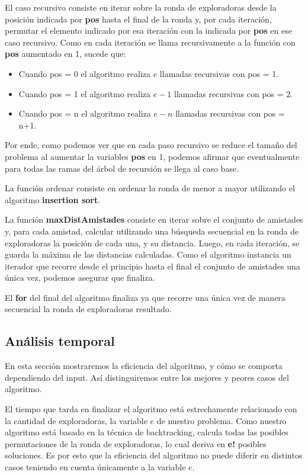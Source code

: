 \documentclass[spanish,a4paper]{article}
\begin{document}
El caso recursivo consiste en iterar sobre la ronda de exploradoras desde la posición indicada por \textbf{pos} 
hasta el final de la ronda y, por cada iteración, permutar el elemento indicado por esa iteración con la indicada por 
\textbf{pos} en ese caso recursivo. 
Como en cada iteración se llama recursivamente a la función con \textbf{pos} aumentado en 1, sucede que:

\begin{itemize}
\item Cuando pos = 0 el algoritmo realiza $e$ llamadas recursivas con pos = 1.
\item Cuando pos = 1 el algoritmo realiza $e-1$ llamadas recursivas con pos = 2.
\item Cuando pos = n el algoritmo realiza $e-n$ llamadas recursivas con pos = n+1.
\end{itemize}

Por ende, como podemos ver que en cada paso recursivo se reduce el tamaño del problema al aumentar la variables 
\textbf{pos} en 1, podemos afirmar que eventualmente para todas las ramas del árbol de recursión se llega al caso base.

La función ordenar consiste en ordenar la ronda de menor a mayor utilizando el algoritmo \textbf{insertion sort}.

La función \textbf{maxDistAmistades} consiste en iterar sobre el conjunto de amistades y, para cada amistad, 
calcular utilizando una búsqueda secuencial en la ronda de exploradoras la posición de cada una, y su distancia.
Luego, en cada iteración, se guarda la máxima de las distancias calculadas.
Como el algoritmo instancia un iterador que recorre desde el principio hasta el final el conjunto de amistades 
una única vez, podemos asegurar que finaliza.

El \textbf{for} del final del algoritmo finaliza ya que recorre una única vez de manera secuencial la ronda 
de exploradoras resultado.

\subsection{Análisis temporal}

En esta sección mostraremos la eficiencia del algoritmo, y cómo se comporta dependiendo del input. Así distinguiremos 
entre los mejores y peores casos del algoritmo.

El tiempo que tarda en finalizar el algoritmo está estrechamente relacionado con la cantidad de exploradoras, la variable $e$ de nuestro problema. Como nuestro algoritmo está basado en la técnica de backtracking, 
calcula todas las posibles permutaciones de la ronda de exploradoras, lo cual deriva en \textbf{e!} posibles soluciones.
Es por esto que la eficiencia del algoritmo no puede diferir en distintos casos teniendo en cuenta únicamente 
a la variable $e$.
\end{document}
